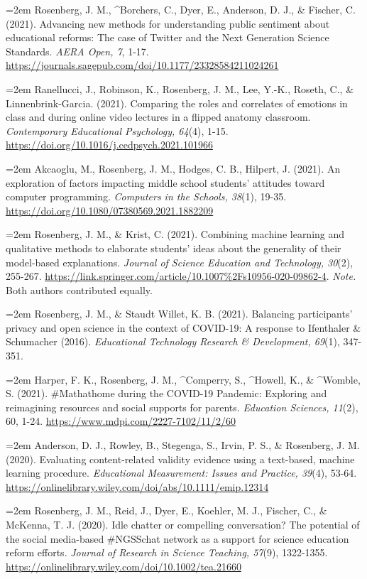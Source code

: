 \documentclass[
  14,
]{article}
\begin{document}
\hangindent=2em Rosenberg, J. M., \^{}Borchers, C., Dyer, E., Anderson,
D. J., \& Fischer, C. (2021). Advancing new methods for understanding
public sentiment about educational reforms: The case of Twitter and the
Next Generation Science Standards. \emph{AERA Open, 7}, 1-17.
\url{https://journals.sagepub.com/doi/10.1177/23328584211024261}

\hangindent=2em Ranellucci, J., Robinson, K., Rosenberg, J. M., Lee,
Y.-K., Roseth, C., \& Linnenbrink-Garcia. (2021). Comparing the roles
and correlates of emotions in class and during online video lectures in
a flipped anatomy classroom. \emph{Contemporary Educational Psychology,
64}(4), 1-15. \url{https://doi.org/10.1016/j.cedpsych.2021.101966}

\hangindent=2em Akcaoglu, M., Rosenberg, J. M., Hodges, C. B., Hilpert,
J. (2021). An exploration of factors impacting middle school students'
attitudes toward computer programming. \emph{Computers in the Schools,
38}(1), 19-35. \url{https://doi.org/10.1080/07380569.2021.1882209}

\hangindent=2em Rosenberg, J. M., \& Krist, C. (2021). Combining machine
learning and qualitative methods to elaborate students' ideas about the
generality of their model-based explanations. \emph{Journal of Science
Education and Technology, 30}(2), 255-267.
\url{https://link.springer.com/article/10.1007\%2Fs10956-020-09862-4}.
\emph{Note.} Both authors contributed equally.

\hangindent=2em Rosenberg, J. M., \& Staudt Willet, K. B. (2021).
Balancing participants' privacy and open science in the context of
COVID-19: A response to Ifenthaler \& Schumacher (2016).
\emph{Educational Technology Research \& Development, 69}(1), 347-351.

\hangindent=2em Harper, F. K., Rosenberg, J. M., \^{}Comperry, S.,
\^{}Howell, K., \& \^{}Womble, S. (2021). \#Mathathome during the
COVID-19 Pandemic: Exploring and reimagining resources and social
supports for parents. \emph{Education Sciences, 11}(2), 60, 1-24.
\url{https://www.mdpi.com/2227-7102/11/2/60}

\hangindent=2em Anderson, D. J., Rowley, B., Stegenga, S., Irvin, P. S.,
\& Rosenberg, J. M. (2020). Evaluating content-related validity evidence
using a text-based, machine learning procedure. \emph{Educational
Measurement: Issues and Practice, 39}(4), 53-64.
\url{https://onlinelibrary.wiley.com/doi/abs/10.1111/emip.12314}

\hangindent=2em Rosenberg, J. M., Reid, J., Dyer, E., Koehler, M. J.,
Fischer, C., \& McKenna, T. J. (2020). Idle chatter or compelling
conversation? The potential of the social media-based \#NGSSchat network
as a support for science education reform efforts. \emph{Journal of
Research in Science Teaching, 57}(9), 1322-1355.
\url{https://onlinelibrary.wiley.com/doi/10.1002/tea.21660}
\end{document}
